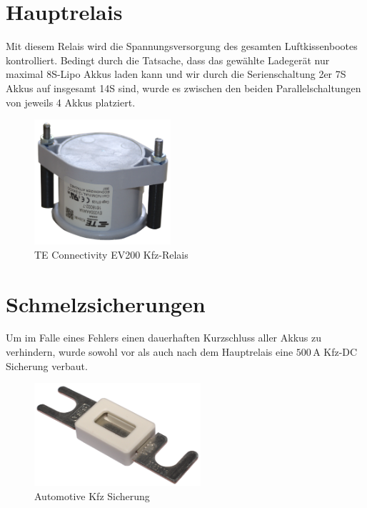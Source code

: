 \section{Hauptrelais}
Mit diesem Relais wird die Spannungsversorgung des gesamten Luftkissenbootes kontrolliert. Bedingt durch die Tatsache, dass das gewählte Ladegerät nur maximal 8S-Lipo Akkus laden kann und wir durch die Serienschaltung 2er 7S Akkus auf insgesamt 14S sind, 
wurde es zwischen den beiden Parallelschaltungen von jeweils 4 Akkus platziert. 
\begin{figure}[h]
    \centering
    \includegraphics[width=0.45\textwidth]{Fotos/Hauptrelais.png}
    \caption{TE Connectivity EV200 Kfz-Relais}
\end{figure}

\section{Schmelzsicherungen\label{sec:schmelzsicherungen}}
Um im Falle eines Fehlers einen dauerhaften Kurzschluss aller Akkus zu verhindern, wurde sowohl vor als auch nach dem Hauptrelais eine $500\,\mathrm{A}$ Kfz-DC Sicherung verbaut.
\begin{figure}[h]
    \centering
    \includegraphics[width=0.55\textwidth]{Fotos/kfz_Sicherung.png}
    \caption{Automotive Kfz Sicherung}
\end{figure}
\newpage

